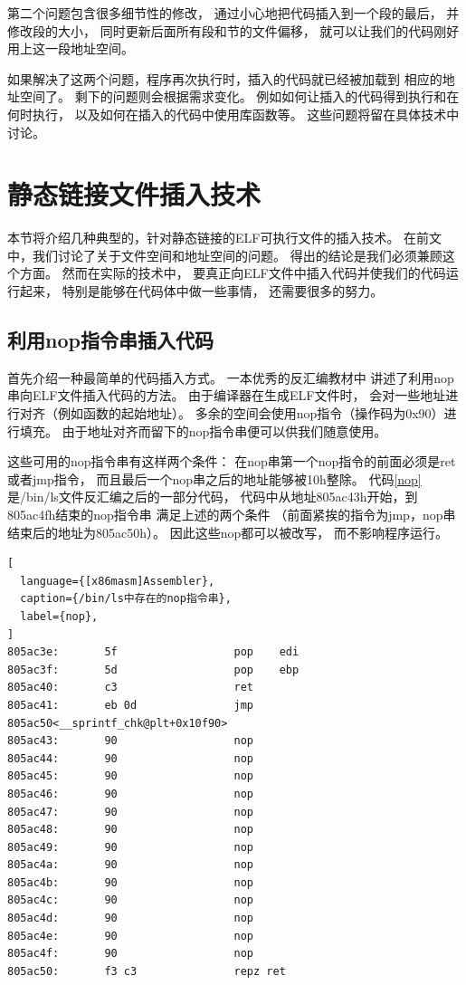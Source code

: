 第二个问题包含很多细节性的修改，
通过小心地把代码插入到一个段的最后，
并修改段的大小，
同时更新后面所有段和节的文件偏移，
就可以让我们的代码刚好用上这一段地址空间。

如果解决了这两个问题，程序再次执行时，插入的代码就已经被加载到
相应的地址空间了。
剩下的问题则会根据需求变化。
例如如何让插入的代码得到执行和在何时执行，
以及如何在插入的代码中使用库函数等。
这些问题将留在具体技术中讨论。

\section{静态链接文件插入技术}

本节将介绍几种典型的，针对静态链接的ELF可执行文件的插入技术。
在前文中，我们讨论了关于文件空间和地址空间的问题。
得出的结论是我们必须兼顾这个方面。
然而在实际的技术中，
要真正向ELF文件中插入代码并使我们的代码运行起来，
特别是能够在代码体中做一些事情，
还需要很多的努力。

\subsection{利用nop指令串插入代码}

首先介绍一种最简单的代码插入方式。
一本优秀的反汇编教材\cite{heike}中
讲述了利用nop串向ELF文件插入代码的方法。
由于编译器在生成ELF文件时，
会对一些地址进行对齐（例如函数的起始地址）。
多余的空间会使用nop指令（操作码为0x90）进行填充。
由于地址对齐而留下的nop指令串便可以供我们随意使用。

这些可用的nop指令串有这样两个条件：
在nop串第一个nop指令的前面必须是ret或者jmp指令，
而且最后一个nop串之后的地址能够被10h整除。
代码\ref{nop}是/bin/ls文件反汇编之后的一部分代码，
代码中从地址805ac43h开始，到805ac4fh结束的nop指令串
满足上述的两个条件
（前面紧挨的指令为jmp，nop串结束后的地址为805ac50h）。
因此这些nop都可以被改写，
而不影响程序运行。

\begin{lstlisting}[
  language={[x86masm]Assembler},
  caption={/bin/ls中存在的nop指令串},
  label={nop},
]
805ac3e:       5f                  pop    edi
805ac3f:       5d                  pop    ebp
805ac40:       c3                  ret
805ac41:       eb 0d               jmp    805ac50<__sprintf_chk@plt+0x10f90>
805ac43:       90                  nop
805ac44:       90                  nop
805ac45:       90                  nop
805ac46:       90                  nop
805ac47:       90                  nop
805ac48:       90                  nop
805ac49:       90                  nop
805ac4a:       90                  nop
805ac4b:       90                  nop
805ac4c:       90                  nop
805ac4d:       90                  nop
805ac4e:       90                  nop
805ac4f:       90                  nop
805ac50:       f3 c3               repz ret
\end{lstlisting}

